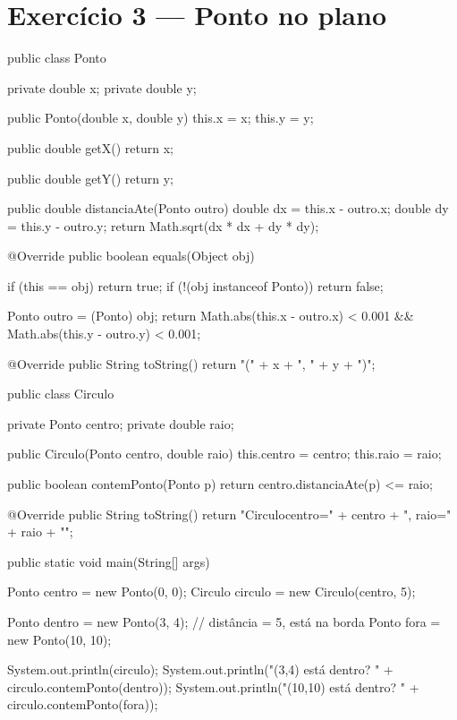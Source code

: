 \documentclass[11pt,a4paper]{article}
\begin{document}
\section{Exercício 3 --- Ponto no plano}

\begin{javacode}
public class Ponto {
    private double x;
    private double y;

    public Ponto(double x, double y) {
        this.x = x;
        this.y = y;
    }

    public double getX() {
        return x;
    }

    public double getY() {
        return y;
    }

    public double distanciaAte(Ponto outro) {
        double dx = this.x - outro.x;
        double dy = this.y - outro.y;
        return Math.sqrt(dx * dx + dy * dy);
    }

    @Override
    public boolean equals(Object obj) {
        if (this == obj) return true;
        if (!(obj instanceof Ponto)) return false;

        Ponto outro = (Ponto) obj;
        return Math.abs(this.x - outro.x) < 0.001 && Math.abs(this.y - outro.y) < 0.001;
    }

    @Override
    public String toString() {
        return "(" + x + ", " + y + ")";
    }
}
\end{javacode}

\begin{javacode}
public class Circulo {
    private Ponto centro;
    private double raio;

    public Circulo(Ponto centro, double raio) {
        this.centro = centro;
        this.raio = raio;
    }

    public boolean contemPonto(Ponto p) {
        return centro.distanciaAte(p) <= raio;
    }

    @Override
    public String toString() {
        return "Circulo{centro=" + centro + ", raio=" + raio + "}";
    }

    public static void main(String[] args) {
        Ponto centro = new Ponto(0, 0);
        Circulo circulo = new Circulo(centro, 5);

        Ponto dentro = new Ponto(3, 4); // distância = 5, está na borda
        Ponto fora = new Ponto(10, 10);

        System.out.println(circulo);
        System.out.println("(3,4) está dentro? " + circulo.contemPonto(dentro));
        System.out.println("(10,10) está dentro? " + circulo.contemPonto(fora));
    }
}
\end{javacode}
\end{document}
